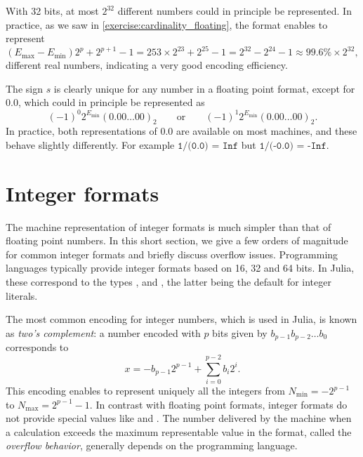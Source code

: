 \begin{remark}
    With 32 bits,
    at most $2^{32}$ different numbers could in principle be represented.
    In practice, as we saw in \cref{exercise:cardinality_floating},
    the  format enables to represent
    \[
        (E_{\max} - E_{\min}) 2^{p} + 2^{p+1} - 1
        = 253 \times 2^{23} + 2^{25} - 1
        = 2^{32} - 2^{24} - 1
        \approx 99.6 \% \times 2^{32},
    \]
    different real numbers,
    indicating a very good encoding efficiency.
\end{remark}

\begin{remark}
    \label{remak:non_uniqueness_0}
    The sign $s$ is clearly unique for any number in a floating point format,
    except for $0.0$,
    which could in principle be represented as
    \[
        (-1)^0 2^{E_{\min}} (0.00\dots00)_2
        \qquad \text{or} \qquad
        (-1)^1 2^{E_{\min}} (0.00\dots00)_2.
    \]
    In practice, both representations of 0.0 are available on most machines,
    and these behave slightly differently.
    For example $\texttt{1/(0.0) = Inf}$ but $\texttt{1/(-0.0) = -Inf}$.
\end{remark}

\section{Integer formats~\moreinfo}%
\label{sec:what_about_integer_formats}

The machine representation of integer formats is much simpler than that of floating point numbers.
In this short section,
we give a few orders of magnitude for common integer formats and briefly discuss overflow issues.
Programming languages typically provide integer formats based on 16, 32 and 64 bits.
In Julia, these correspond to the types ,  and ,
the latter being the default for integer literals.

The most common encoding for integer numbers,
which is used in Julia, is known as \emph{two's complement}:
a number encoded with $p$ bits given by $b_{p-1} b_{p-2} \dots b_{0}$ corresponds to
\[
    x = - b_{p-1} 2^{p-1} + \sum_{i=0}^{p-2} b_i 2^i.
\]
This encoding enables to represent uniquely all the integers from $N_{\min} = -2^{p-1}$ to $N_{\max} = 2^{p-1}-1$.
In contrast with floating point formats,
integer formats do not provide special values like  and .
The number delivered by the machine when a calculation exceeds the maximum representable value in the format,
called the \emph{overflow behavior}, generally depends on the programming language.

